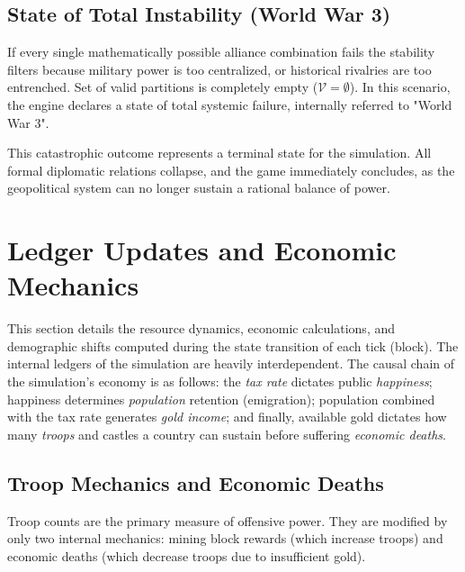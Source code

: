 \subsection{State of Total Instability (World War 3)}
If every single mathematically possible alliance combination fails the stability filters because military power is too centralized, or historical rivalries are too entrenched. Set of valid partitions is completely empty ($\mathcal{V} = \emptyset$). In this scenario, the engine declares a state of total systemic failure, internally referred to "World War 3".

This catastrophic outcome represents a terminal state for the simulation. All formal diplomatic relations collapse, and the game immediately concludes, as the geopolitical system can no longer sustain a rational balance of power.

\section{Ledger Updates and Economic Mechanics}
This section details the resource dynamics, economic calculations, and demographic shifts computed during the state transition of each tick (block). The internal ledgers of the simulation are heavily interdependent. The causal chain of the simulation's economy is as follows: the \textit{tax rate} dictates public \textit{happiness}; happiness determines \textit{population} retention (emigration); population combined with the tax rate generates \textit{gold income}; and finally, available gold dictates how many \textit{troops} and castles a country can sustain before suffering \textit{economic deaths}.


\subsection{Troop Mechanics and Economic Deaths}
Troop counts are the primary measure of offensive power. They are modified by only two internal mechanics: mining block rewards (which increase troops) and economic deaths (which decrease troops due to insufficient gold).

